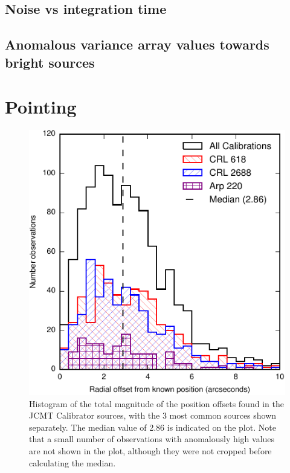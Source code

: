 \documentclass[twocolumn]{aastex6}
\begin{document}
\subsection{Noise vs integration time}
\subsection{Anomalous variance array values towards bright sources}

\section{Pointing}
\begin{figure}
  \centering
  \includegraphics{pointing-offsets-by-source.pdf}
  \caption{Histogram of the total magnitude of the position offsets
    found in the JCMT Calibrator sources, with the 3 most common
    sources shown separately. The median value of 2.86\arcsec{} is
    indicated on the plot. Note that a small number of observations
    with anomalously high values are not shown in the plot, although
    they were not cropped before calculating the median.}
  \label{fig:pointing}
\end{figure}
\end{document}
